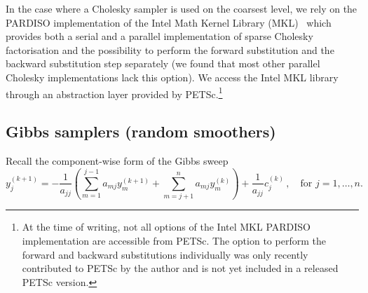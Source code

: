 \documentclass[
fontsize=11pt,
paper=a4,
numbers=noenddot
]{scrartcl}
\begin{document}
 In the case where a Cholesky sampler is used on the coarsest level, we rely on the PARDISO implementation of the Intel Math Kernel Library (MKL)~\cite{intelmkl} which provides both a serial and a parallel implementation of sparse Cholesky factorisation and the possibility to perform the forward substitution and the backward substitution step separately (we found that most other parallel Cholesky implementations lack this option). We access the Intel MKL library through an abstraction layer provided by PETSc.\footnote{At the time of writing, not all options of the Intel MKL PARDISO implementation are accessible from PETSc. The option to perform the forward and backward substitutions individually was only recently contributed to PETSc by the author and is not yet included in a released PETSc version.} 

\subsection{Gibbs samplers (random smoothers)}

Recall the component-wise form of the Gibbs sweep
\begin{equation*}
    y^{(k+1)}_j = - \frac{1}{a_{jj}} \left(
        \sum_{m=1}^{j-1} a_{mj} y^{(k+1)}_m + \sum_{m=j+1}^n a_{mj} y^{(k)}_m
    \right) + \frac{1}{a_{jj}} c^{(k)}_j \,,\quad \text{for $j=1,\dotsc,n$.}
\end{equation*}
\end{document}
